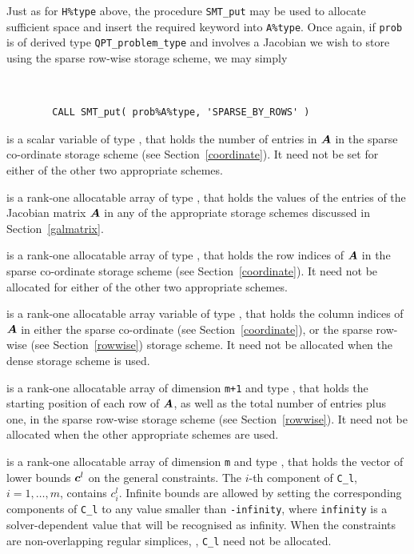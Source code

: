\documentclass{galahad}
\newcommand{\packagename}{QPT}
\begin{document}
\begin{description}
\begin{description}
Just as for {\tt H\%type} above, the procedure {\tt SMT\_put}
may be used to allocate sufficient space and insert the required keyword
into {\tt A\%type}.
Once again, if {\tt prob} is of derived type {\tt \packagename\_problem\_type}
and involves a Jacobian we wish to store using the sparse row-wise
storage scheme, we may simply
{\tt
\begin{verbatim}
        CALL SMT_put( prob%A%type, 'SPARSE_BY_ROWS' )
\end{verbatim}
}
\noindent

 is a scalar variable of type \integer, that
holds the number of entries in ${\bm{A}}$
in the sparse co-ordinate storage scheme (see Section~\ref{coordinate}).
It need not be set for either of the other two appropriate schemes.

 is a rank-one allocatable array of type \realdp, that holds
the values of the entries of the Jacobian matrix ${\bm{A}}$ in any of the
appropriate storage schemes discussed in Section~\ref{galmatrix}.

 is a rank-one allocatable array of type \integer,
that holds the row indices of ${\bm{A}}$ in the sparse co-ordinate storage
scheme (see Section~\ref{coordinate}).
It need not be allocated for either of the other two appropriate schemes.

 is a rank-one allocatable array variable of type \integer,
that holds the column indices of ${\bm{A}}$ in either the sparse co-ordinate
(see Section~\ref{coordinate}), or the sparse row-wise
(see Section~\ref{rowwise}) storage scheme.
It need not be allocated when the dense storage scheme is used.

 is a rank-one allocatable array of dimension {\tt m+1} and type
\integer, that holds the
starting position of each row of ${\bm{A}}$, as well
as the total number of entries plus one, in the sparse row-wise storage
scheme (see Section~\ref{rowwise}). It need not be allocated when the
other appropriate schemes are used.

\end{description}

 is a rank-one allocatable array of dimension {\tt m} and type
\realdp, that holds the vector of lower bounds ${\bm{c}}^{l}$
on the general constraints. The $i$-th component of
{\tt C\_l}, $i = 1, \ldots , m$, contains $c_{i}^{l}$.
Infinite bounds are allowed by setting the corresponding
components of {\tt C\_l} to any value smaller than {\tt -infinity},
where {\tt infinity} is a  solver-dependent value that will be recognised as
infinity. 
When the constraints are non-overlapping regular simplices, ,
{\tt C\_l} need not be allocated.


\end{description}
\end{document}
